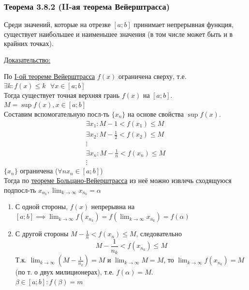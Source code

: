 \documentclass[12pt]{article}
\def\posl#1#2{\{#1_{#2}\}}
\begin{document}
    \subsubsection*{Теорема 3.8.2 (II-ая теорема Вейерштрасса)}\label{th:3.8.2}
    Среди значений, которые на отрезке $[a; b]$ принимает непрерывная функция, существует наибольшее и наименьшее значения (в том числе может быть и в крайних точках).\par\noindent
    \underline{Доказательство:}
    \begin{adjustwidth}{1.5em}{1.5em}
        По \hyperref[th:3.8.1]{I-ой теореме Вейерштрасса} $f(x)$ ограничена сверху, т.е. $\exists k : f(x) \le k \text{ }  \forall x \in [a; b]$\\
        Тогда существует точная верхняя грань $f(x)$ на $[a; b]$. $M = \sup f(x), x \in [a; b]$\\
        Составим вспомогательную посл-ть $\posl{x}{n}$ на основе свойства $\sup f(x)$.
        \begin{gather*}
            \exists x_1 : M - 1 < f(x_1) \le M\\
            \exists x_2 : M - \frac{1}{2} < f(x_2) \le M\\
            \vdots\\
            \exists x_n : M - \frac{1}{n} < f(x_n) \le M\\
            \vdots
        \end{gather*}
        $\posl{x}{n}$ ограничена ($\forall n x_n \in [a; b]$)\\
        Тогда по \hyperref[th:2.8.1]{теореме Больцано-Вейерштрасса} из неё можно извлечь сходящуюся подпосл-ть $x_{n_k}, \lim_{k\to\infty}x_{n_k} = \alpha$
        \begin{enumerate}
            \item С одной стороны, $f(x)$ непрерывна на $[a; b] \implies \lim_{k\to\infty}f(x_{n_k}) = f(\lim_{k\to\infty}x_{n_k}) = f(\alpha)$
            \item С другой стороны $M - \frac{1}{n} < f(x_n) \le M$, следовательно
            \[
                M - \frac{1}{n_k} < f(x_{n_k}) \le M
            \]
            Т.к. $\lim_{k\to\infty} (M - \frac{1}{n_k}) = M$ и $\lim_{k\to\infty} M = M$, то $\lim_{k\to\infty}f(x_{n_k}) = M$ (по т. о двух милиционерах), т.е. $f(\alpha) = M$.\\
            $\beta \in [a; b] : f(\beta) = m$
        \end{enumerate}
    \end{adjustwidth}
\end{document}
